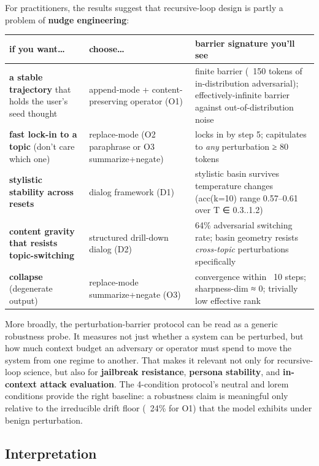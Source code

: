 \documentclass{article}
\theoremstyle{plain}
\theoremstyle{definition}
\begin{document}
For practitioners, the results suggest that recursive-loop design is
partly a problem of \textbf{nudge engineering}:

\begin{table}[h!]
\centering
\small
\begin{tabular}{lll}
\toprule
if you want… & choose… & barrier signature you'll see \\
\midrule
\textbf{a stable trajectory} that holds the user's seed thought & append-mode + content-preserving operator (O1) & finite barrier (~150 tokens of in-distribution adversarial); effectively-infinite barrier against out-of-distribution noise \\
\textbf{fast lock-in to a topic} (don't care which one) & replace-mode (O2 paraphrase or O3 summarize+negate) & locks in by step 5; capitulates to \textit{any} perturbation ≥ 80 tokens \\
\textbf{stylistic stability across resets} & dialog framework (D1) & stylistic basin survives temperature changes (acc(k=10) range 0.57–0.61 over T ∈ {0.3..1.2}) \\
\textbf{content gravity that resists topic-switching} & structured drill-down dialog (D2) & 64\% adversarial switching rate; basin geometry resists \textit{cross-topic} perturbations specifically \\
\textbf{collapse} (degenerate output) & replace-mode summarize+negate (O3) & convergence within ~10 steps; sharpness-dim ≈ 0; trivially low effective rank \\
\bottomrule
\end{tabular}
\end{table}

More broadly, the perturbation-barrier protocol can be read as a
generic robustness probe. It measures not just whether a system can
be perturbed, but how much context budget an adversary or operator
must spend to move the system from one regime to another. That makes
it relevant not only for recursive-loop science, but also for
\textbf{jailbreak resistance}, \textbf{persona stability}, and \textbf{in-context
attack evaluation}. The 4-condition protocol's neutral and lorem
conditions provide the right baseline: a robustness claim is
meaningful only relative to the irreducible drift floor (~24\% for
O1) that the model exhibits under benign perturbation.

\subsection{Interpretation}
\end{document}

